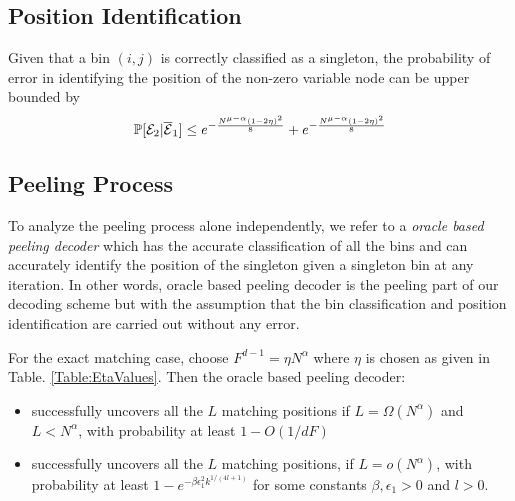 \subsection{\bf Position Identification}
\begin{lemma}
Given that a bin $(i,j)$ is correctly classified as a singleton, the probability of error in identifying the position of the non-zero variable node can be upper bounded by
\begin{align*}
\mathbb{P}[\mathcal{E}_2|\overline{\mathcal{E}}_1]\leq e^{-\frac{N^{\mu-\alpha}(1-2\eta)^2}{8}}+e^{-\frac{N^{\mu-\alpha}(1-2\eta)^2}{8}}
\end{align*}
\end{lemma}

\subsection{\bf Peeling Process}
To analyze the peeling process alone independently, we refer to a {\it oracle based peeling decoder} which has the accurate classification of all the bins and can accurately  identify the position of the singleton given a singleton bin at any iteration. In other words, oracle based peeling decoder is the peeling part of our decoding scheme but with the assumption that the bin classification and position identification are carried out without any error.
\begin{lemma}
For the exact matching case, choose $F^{d-1}=\eta N^\alpha$ where $\eta$ is chosen as given in Table. \ref{Table:EtaValues}. Then the oracle based peeling decoder:
\begin{itemize}
\item successfully uncovers all the $L$ matching positions if $L=\Omega(N^{\alpha})$ and $L<N^{\alpha}$, with probability at least $1-O(1/dF)$
\item successfully uncovers all the $L$ matching positions, if $L=o(N^{\alpha})$, with probability at least $1-e^{-\beta \epsilon_1^2k^{1/(4l+1)}}$ for some constants $\beta,\epsilon_1>0$ and $l>0.$
\end{itemize}
\end{lemma}
